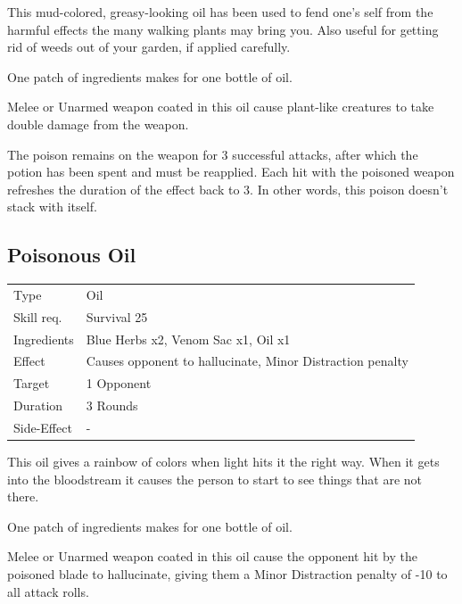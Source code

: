 \documentclass[11pt,a4paper,twocolumn]{book}
\begin{document}
\medskip

This mud-colored, greasy-looking oil has been used to fend one's self from the harmful effects the many walking plants may bring you. Also useful for getting rid of weeds out of your garden, if applied carefully.

One patch of ingredients makes for one bottle of oil.

Melee or Unarmed weapon coated in this oil cause plant-like creatures to take double damage from the weapon.

The poison remains on the weapon for 3 successful attacks, after which the potion has been spent and must be reapplied. Each hit with the poisoned weapon refreshes the duration of the effect back to 3. In other words, this poison doesn't stack with itself.
\vfill

\subsection*{Poisonous Oil}
{
	\begin{tabu} to 75mm{| X[l,4] | X[l,8] |}
		\hline
		Type 			& Oil 															\\
        Skill req.	    & Survival 25 													\\
        Ingredients     & Blue Herbs x2, Venom Sac x1, Oil x1							\\
        Effect     		& Causes opponent to hallucinate, Minor Distraction penalty 	\\
        Target      	& 1 Opponent													\\
        Duration  		& 3 Rounds	 													\\
        Side-Effect     & -																\\ \hline
	\end{tabu}
		
}

\medskip

This oil gives a rainbow of colors when light hits it the right way. When it gets into the bloodstream it causes the person to start to see things that are not there.

One patch of ingredients makes for one bottle of oil.

Melee or Unarmed weapon coated in this oil cause the opponent hit by the poisoned blade to hallucinate, giving them a Minor Distraction penalty of -10 to all attack rolls.
\end{document}
